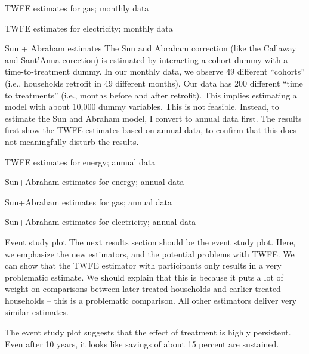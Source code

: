 \documentclass[8pt]{beamer}
\begin{document}
\begin{frame}{TWFE estimates for gas; monthly data}
	
\end{frame}

\begin{frame}{TWFE estimates for electricity; monthly data}
	
\end{frame}

\begin{frame}{Sun + Abraham estimates}
	The Sun and Abraham correction (like the Callaway and Sant'Anna corection) is estimated by interacting a cohort dummy with a time-to-treatment dummy. In our monthly data, we observe 49 different ``cohorts'' (i.e., households retrofit in 49 different months).  Our data has 200 different ``time to treatments'' (i.e., months before and after retrofit). This implies estimating a model with about 10,000 dummy variables.  This is not feasible. Instead, to estimate the Sun and Abraham model, I convert to annual data first. The results first show the TWFE estimates based on annual data, to confirm that this does not meaningfully disturb the results.
\end{frame}

\begin{frame}{TWFE estimates for energy; annual data}
	
\end{frame}

\begin{frame}{Sun+Abraham estimates for energy; annual data}
	
\end{frame}

\begin{frame}{Sun+Abraham estimates for gas; annual data}
	
\end{frame}

\begin{frame}{Sun+Abraham estimates for electricity; annual data}
	
\end{frame}

\begin{frame}{Event study plot}
	The next results section should be the event study plot. Here, we emphasize the new estimators, and the potential problems with TWFE.  We can show that the TWFE estimator with participants only results in a very problematic estimate. We should explain that this is because it puts a lot of weight on comparisons between later-treated households and earlier-treated households -- this is a problematic comparison.  All other estimators deliver very similar estimates.
	
	The event study plot suggests that the effect of treatment is highly persistent. Even after 10 years, it looks like savings of about 15 percent are sustained.
\end{frame}
\end{document}
